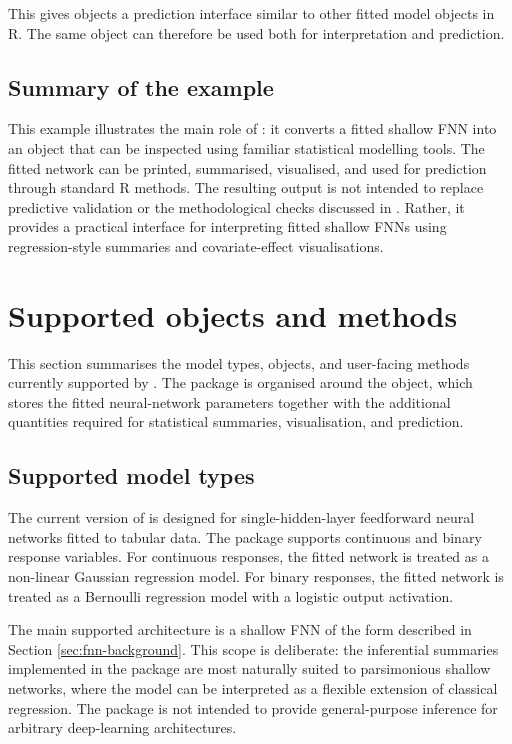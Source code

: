 This gives  objects a prediction interface similar to other fitted model objects in R.
The same object can therefore be used both for interpretation and prediction.

\subsection{Summary of the example}\label{summary-of-the-example}

This example illustrates the main role of : it converts a fitted shallow FNN into an object that can be inspected using familiar statistical modelling tools.
The fitted network can be printed, summarised, visualised, and used for prediction through standard R methods.
The resulting output is not intended to replace predictive validation or the methodological checks discussed in \citet{mcinerney2023feedforward}.
Rather, it provides a practical interface for interpreting fitted shallow FNNs using regression-style summaries and covariate-effect visualisations.

\section{Supported objects and methods}\label{sec:methods}

This section summarises the model types, objects, and user-facing methods currently supported by .
The package is organised around the  object, which stores the fitted neural-network parameters together with the additional quantities required for statistical summaries, visualisation, and prediction.

\subsection{Supported model types}\label{supported-model-types}

The current version of  is designed for single-hidden-layer feedforward neural networks fitted to tabular data.
The package supports continuous and binary response variables.
For continuous responses, the fitted network is treated as a non-linear Gaussian regression model.
For binary responses, the fitted network is treated as a Bernoulli regression model with a logistic output activation.

The main supported architecture is a shallow FNN of the form described in Section \ref{sec:fnn-background}.
This scope is deliberate: the inferential summaries implemented in the package are most naturally suited to parsimonious shallow networks, where the model can be interpreted as a flexible extension of classical regression.
The package is not intended to provide general-purpose inference for arbitrary deep-learning architectures.

